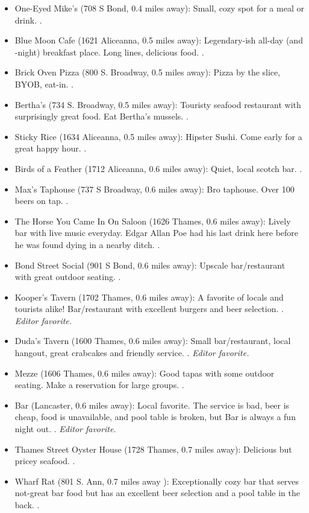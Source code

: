 \begin{itemize}
\item{One-Eyed Mike's (708 S Bond, 0.4 miles away): Small, cozy spot for a meal or drink. \postdoc.}
\item{Blue Moon Cafe (1621 Aliceanna, 0.5 miles away): Legendary-ish all-day (and -night) breakfast place. Long lines, delicious food. \gradstudent.}
\item{Brick Oven Pizza (800 S. Broadway, 0.5 miles away): Pizza by the slice, BYOB, eat-in. \gradstudent.}
\item{Bertha's (734 S. Broadway, 0.5 miles away): Touristy seafood restaurant with surprisingly great food. Eat Bertha's mussels. \postdoc.}
\item{Sticky Rice (1634 Aliceanna, 0.5 miles away): Hipster Sushi. Come early for a great happy hour. \postdoc.}
\item{Birds of a Feather (1712 Aliceanna, 0.6 miles away): Quiet, local scotch bar. \postdoc.}
\item{Max's Taphouse (737 S Broadway, 0.6 miles away): Bro taphouse. Over 100 beers on tap. \postdoc.}
\item{The Horse You Came In On Saloon (1626 Thames, 0.6 miles away): Lively bar with live music everyday. Edgar Allan Poe had his last drink here before he was found dying in a nearby ditch. \postdoc.}
\item{Bond Street Social (901 S Bond, 0.6 miles away): Upscale bar/restaurant with great outdoor seating. \professor.}
\item{Kooper's Tavern (1702 Thames, 0.6 miles away): A favorite of locals and tourists alike! Bar/restaurant with excellent burgers and beer selection. \postdoc. \it{Editor favorite}.}
\item{Duda's Tavern (1600 Thames, 0.6 miles away): Small bar/restaurant, local hangout, great crabcakes and friendly service. \postdoc. \it{Editor favorite}.}
\item{Mezze (1606 Thames, 0.6 miles away): Good tapas with some outdoor seating. Make a reservation for large groups. \professor.}
\item{Bar (Lancaster, 0.6 miles away): Local favorite. The service is bad, beer is cheap, food is unavailable, and pool table is broken, but Bar is always a fun night out. \gradstudent. \it{Editor favorite}.}
\item{Thames Street Oyster House (1728 Thames, 0.7 miles away): Delicious but pricey seafood. \professor.}
\item{Wharf Rat (801 S. Ann, 0.7 miles away ): Exceptionally cozy bar that serves not-great bar food but has an excellent beer selection and a pool table in the back. \gradstudent.}

\end{itemize}
